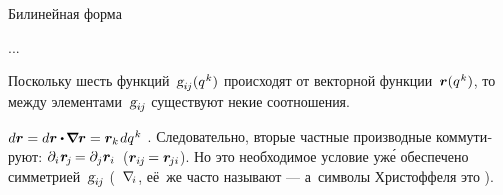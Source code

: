 \begin{otherlanguage}{russian}
Билинейная форма

\nopagebreak ...

Поскольку шесть функций~${\textsl{g}_{i\hspace{-0.1ex}j}(q^{\hspace{.1ex}k})}$ происходят от векторной функции~${\bm{r}(q^{\hspace{.1ex}k})}$, то между элементами~$\textsl{g}_{i\hspace{-0.1ex}j}$ существуют некие соотношения.

 ${d\bm{r} = d\bm{r} \dotp \hspace{-0.2ex} \tikzmark{beginItsUnitTensorE} \boldnabla \bm{r} \tikzmark{endItsUnitTensorE} = \bm{r}_k \hspace{0.2ex} dq^{\hspace{.1ex}k}}$\ru{\:---} . Следовательно, вторые частные производные коммутируют: ${\partial_i \hspace{.12ex} \bm{r}_{\hspace{-0.2ex}j} \hspace{-0.2ex} = \partial_j \bm{r}_i}$~(${\bm{r}_{i\hspace{-0.1ex}j} \hspace{-0.2ex} = \bm{r}_{\hspace{-0.2ex}ji}}$).
Но это необходимое условие уж\'{е} обеспечено симметрией~${\textsl{g}_{i\hspace{-0.1ex}j}}$ (~$\nabla_{\hspace{-0.32ex}i\hspace{.1ex}}$, её~же часто называют \:--- а~символы Христоффеля это  ).


\end{otherlanguage}
